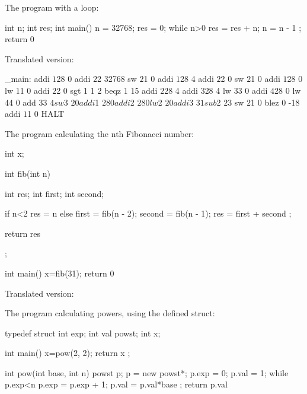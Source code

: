 The program with a loop:
\begin{codeblock}
int n;
int res;
int main(){
n = 32768;
res = 0;
while n>0 {
res = res + n;
n = n - 1
};
return 0
}~
\end{codeblock}
Translated version:
\begin{codeblock}
_main:
addi $1 $28 0
addi $2 $2 32768
sw $2 $1 0
addi $1 $28 4
addi $2 $2 0
sw $2 $1 0
addi $1 $28 0
lw $1 $1 0
addi $2 $2 0
sgt 1 1 2
beqz 1 15
addi $2 $28 4
addi $3 $28 4
lw $3 $3 0
addi $4 $28 0
lw $4 $4 0
add $3 $3 $4
sw $3 $2 0
addi $1 $28 0
addi $2 $28 0
lw $2 $2 0
addi $3 $3 1
sub $2 $2 $3
sw $2 $1 0
blez 0 -18
addi $1 $1 0
HALT
\end{codeblock}
The program calculating the nth Fibonacci number:
\begin{codeblock}
int x;

int fib(int n){
int res;
int first;
int second;

if n<2 {res = n} else {
first = fib(n - 2);
second = fib(n - 1);
res = first + second
};

return res
};

int main(){
x=fib(31);
return 0
}~
\end{codeblock}
Translated version:
\newpage
The program calculating powers, using the defined struct:
\begin{codeblock}
typedef struct {int exp; int val} powst;
int x;

int main(){
x=pow(2, 2);
return x
};

int pow(int base, int n){
powst p;
p = new powst*;
p.exp = 0;
p.val = 1;
while p.exp<n {
p.exp = p.exp + 1;
p.val = p.val*base
};
return p.val
}~
\end{codeblock}
